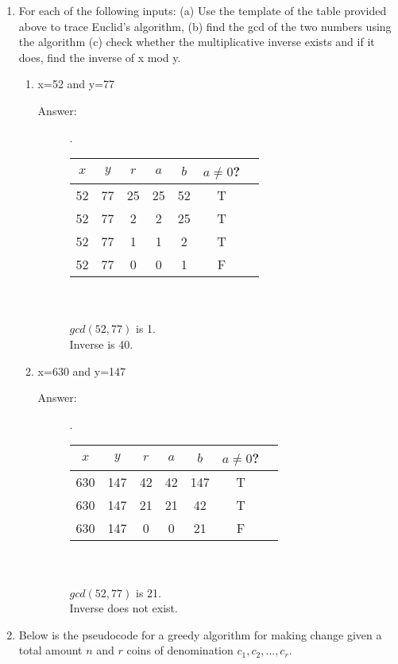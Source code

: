 \documentclass[12pt, oneside]{article}
\begin{document}
\begin{enumerate}
\item For each of the following inputs: (a) Use the template of the table provided above to trace Euclid's algorithm, (b) find the gcd of the two numbers using the algorithm (c) check whether the multiplicative inverse exists and if it does, find the inverse of x mod y.
\begin{enumerate}
    \item x=52 and y=77
    \begin{description}
    \item[Answer:] .\\
    \begin{tabular}{c|c|c|c|c|c|c|}
        $x$ & $y$  & $r$ & $a$ & $b$ & $a \neq 0$?\\
        \hline 
            52 & 77 & 25 & 25 & 52 & T\\
            52 & 77 & 2 & 2 & 25 & T\\
            52 & 77 & 1 & 1 & 2 & T\\
            52 & 77 & 0 & 0 & 1 & F\\
        \end{tabular}\\\\
        $gcd(52,77)$ is 1.\\
        Inverse is 40.
    \end{description}
    \item x=630 and y=147
    \begin{description}
        \item[Answer:] .\\
        \begin{tabular}{c|c|c|c|c|c|c|}
            $x$ & $y$  & $r$ & $a$ & $b$ & $a \neq 0$?\\
            \hline 
                630 & 147 & 42 & 42 & 147 & T\\
                630 & 147 & 21 & 21 & 42 & T\\
                630 & 147 & 0 & 0 & 21 & F\\
            \end{tabular}\\\\
            $gcd(52,77)$ is 21.\\
            Inverse does not exist.
        \end{description}
\end{enumerate}



\item Below is the pseudocode for a greedy algorithm for making change given a total amount $n$ and $r$ coins of denomination $c_1, c_2,\ldots,c_r$.



\end{enumerate}
\end{document}
